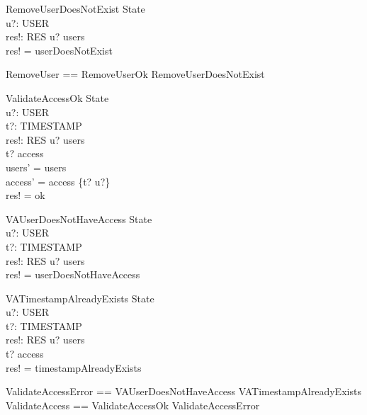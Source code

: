 \begin{schema}{RemoveUserDoesNotExist}
    \Xi State \\
    u?: USER \\
    res!: RES
    \where
    u? \notin users \\
    res! = userDoesNotExist
\end{schema}

\begin{zed}
    RemoveUser == RemoveUserOk \lor RemoveUserDoesNotExist
\end{zed}

\begin{schema}{ValidateAccessOk}
    \Delta State \\
    u?: USER \\
    t?: TIMESTAMP \\
    res!: RES
    \where
    u? \in users \\
    t? \notin \dom access \\
    users' = users \\
    access' = access \cup \{t? \mapsto u?\} \\
    res! = ok
\end{schema}

\begin{schema}{VAUserDoesNotHaveAccess}
    \Xi State \\
    u?: USER \\
    t?: TIMESTAMP \\
    res!: RES
    \where
    u? \notin users \\
    res! = userDoesNotHaveAccess
\end{schema}

\begin{schema}{VATimestampAlreadyExists}
    \Xi State \\
    u?: USER \\
    t?: TIMESTAMP \\
    res!: RES
    \where
    u? \in users \\
    t? \in \dom access \\
    res! = timestampAlreadyExists
\end{schema}

\begin{zed}
    ValidateAccessError == VAUserDoesNotHaveAccess \lor VATimestampAlreadyExists \\
    ValidateAccess == ValidateAccessOk \lor ValidateAccessError
\end{zed}